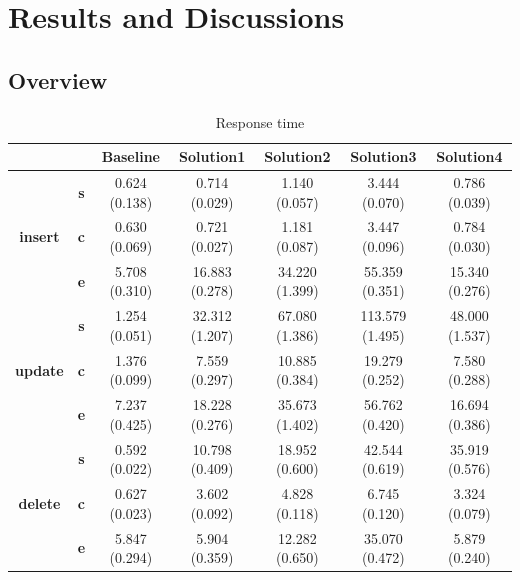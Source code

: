 \chapter{Results and Discussions}

\section{Overview}


\begin{table}[h]
\newcommand{\B}[1]{\colorbox{light-gray}{#1}}
 \centering
\caption{Response time}\label{t:}
\begin{tabular}{ccccccc}
\toprule
&&\textbf{Baseline} & \textbf{Solution1} & \textbf{Solution2} & \textbf{Solution3} & \textbf{Solution4}\\
\midrule
\multirow{3}{*}{\textbf{insert}} & \textbf{s} & 0.624 (0.138) & 0.714 (0.029) & 1.140 (0.057) & 3.444 (0.070) & 0.786 (0.039)\\
 & \textbf{c} & 0.630 (0.069) & 0.721 (0.027) & 1.181 (0.087) & 3.447 (0.096) & 0.784 (0.030)\\
 & \textbf{e} & 5.708 (0.310) & 16.883 (0.278) & 34.220 (1.399) & 55.359 (0.351) & 15.340 (0.276)\\
\midrule
\multirow{3}{*}{\textbf{update}} & \textbf{s} & 1.254 (0.051) & 32.312 (1.207) & 67.080 (1.386) & 113.579 (1.495) & 48.000 (1.537)\\
 & \textbf{c} & 1.376 (0.099) & 7.559 (0.297) & 10.885 (0.384) & 19.279 (0.252) & 7.580 (0.288)\\
 & \textbf{e} & 7.237 (0.425) & 18.228 (0.276) & 35.673 (1.402) & 56.762 (0.420) & 16.694 (0.386)\\
\midrule
\multirow{3}{*}{\textbf{delete}} & \textbf{s} & 0.592 (0.022) & 10.798 (0.409) & 18.952 (0.600) & 42.544 (0.619) & 35.919 (0.576)\\
 & \textbf{c} & 0.627 (0.023) & 3.602 (0.092) & 4.828 (0.118) & 6.745 (0.120) & 3.324 (0.079)\\
 & \textbf{e} & 5.847 (0.294) & 5.904 (0.359) & 12.282 (0.650) & 35.070 (0.472) & 5.879 (0.240)\\
\bottomrule
\end{tabular}
\end{table}



